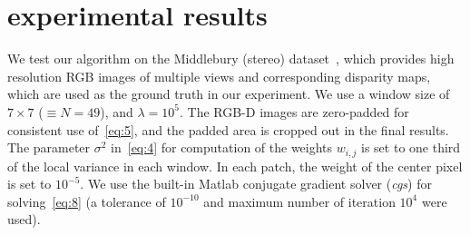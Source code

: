 \section{experimental results}
\label{sec:2.result}
We test our algorithm on the Middlebury (stereo) dataset~\cite{scharstein2003high,scharstein2007learning,hirschmuller2007evaluation,scharstein2014high}, which provides high resolution RGB images of multiple views and corresponding disparity maps, which are used as the ground truth in our experiment. We use a window size of $7\times 7$ ($\equiv N=49$), and $\lambda=10^5$. The RGB-D images are zero-padded for consistent use of~\eqref{eq:5}, and the padded area is cropped out in the final results. The parameter $\sigma^2$ in~\eqref{eq:4} for computation of the weights $w_{i,j}$ is set to one third of the local variance in each window. In each patch, the weight of the center pixel is set to $10^{-5}$. We use the built-in Matlab conjugate gradient solver (\emph{cgs}) for solving~\eqref{eq:8} (a tolerance of $10^{-10}$ and maximum number of iteration $10^4$ were used).

